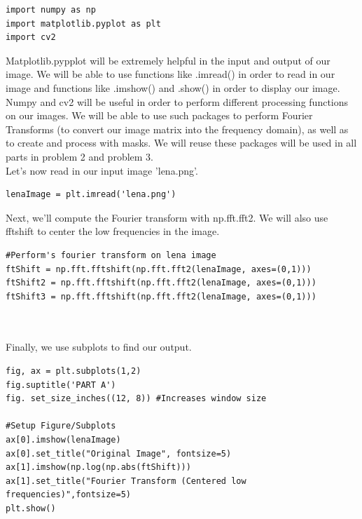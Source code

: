 \documentclass[12pt]{article}
\begin{document}
\begin{mdframed}[backgroundcolor=bg]
\begin{verbatim}
import numpy as np
import matplotlib.pyplot as plt
import cv2
\end{verbatim}
\end{mdframed}
\;
\;

\noindent Matplotlib.pypplot will be extremely helpful in the input and output of our image. We will be able to use functions like .imread() in order to read in our image and functions like .imshow() and .show() in order to display our image.\\

\noindent Numpy and cv2 will be useful in order to perform different processing functions on our images. We will be able to use such packages to perform Fourier Transforms (to convert our image matrix into the frequency domain), as well as to create and process with masks. We will reuse these packages will be used in all parts in problem 2 and problem 3.\\

\noindent Let's now read in our input image 'lena.png'.\\

\begin{mdframed}[backgroundcolor=bg]
\begin{verbatim}
lenaImage = plt.imread('lena.png')
\end{verbatim}
\end{mdframed}
\;
\;


\noindent Next, we'll compute the Fourier transform with np.fft.fft2. We will also use fftshift to center the low frequencies in the image.\\

\begin{mdframed}[backgroundcolor=bg]
\begin{verbatim}
#Perform's fourier transform on lena image
ftShift = np.fft.fftshift(np.fft.fft2(lenaImage, axes=(0,1)))
ftShift2 = np.fft.fftshift(np.fft.fft2(lenaImage, axes=(0,1)))
ftShift3 = np.fft.fftshift(np.fft.fft2(lenaImage, axes=(0,1))) 
\end{verbatim}
\end{mdframed}
\;
\;
\pagebreak\\\\

\noindent Finally, we use subplots to find our output.
\begin{mdframed}[backgroundcolor=bg]
\begin{verbatim}
fig, ax = plt.subplots(1,2)
fig.suptitle('PART A')
fig. set_size_inches((12, 8)) #Increases window size

#Setup Figure/Subplots
ax[0].imshow(lenaImage)
ax[0].set_title("Original Image", fontsize=5)
ax[1].imshow(np.log(np.abs(ftShift)))
ax[1].set_title("Fourier Transform (Centered low frequencies)",fontsize=5)
plt.show()
\end{verbatim}
\end{mdframed}
\;
\;
\end{document}
